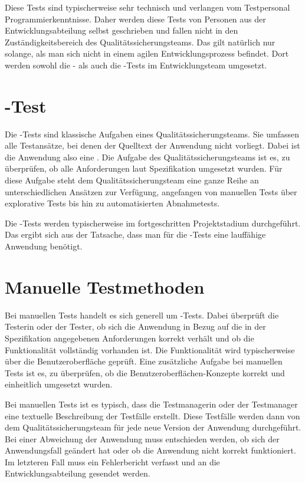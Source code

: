 \SuperPar
Diese Tests sind typischerweise sehr technisch und verlangen vom Testpersonal Programmierkenntnisse. Daher werden diese Tests von Personen aus der Entwicklungsabteilung selbst geschrieben und fallen nicht in den Zuständigkeitsbereich des Qualitätssicherungsteams. Das gilt natürlich nur solange, als man sich nicht in einem agilen Entwicklungsprozess befindet. Dort werden sowohl die - als auch die -Tests im Entwicklungsteam umgesetzt.


\section{-Test}

Die -Tests sind klassische Aufgaben eines Qualitätssicherungsteams. Sie umfassen alle Testansätze, bei denen der Quelltext der Anwendung nicht vorliegt. Dabei ist die Anwendung also eine . Die Aufgabe des Qualitätssicherungsteams ist es, zu überprüfen, ob alle Anforderungen laut Spezifikation umgesetzt wurden. Für diese Aufgabe steht dem Qualitätssicherungsteam eine ganze Reihe an unterschiedlichen Ansätzen zur Verfügung, angefangen von manuellen Tests über explorative Tests bis hin zu automatisierten Abnahmetests. 

\SuperPar
Die -Tests werden typischerweise im fortgeschritten Projektstadium durchgeführt. Das ergibt sich aus der Tatsache, dass man für die -Tests eine lauffähige Anwendung benötigt.

\section{Manuelle Testmethoden}

Bei manuellen Tests handelt es sich generell um -Tests. Dabei überprüft die Testerin oder der Tester, ob sich die Anwendung in Bezug auf die in der Spezifikation angegebenen Anforderungen korrekt verhält und ob die Funktionalität vollständig vorhanden ist. Die Funktionalität wird typischerweise über die Benutzeroberfläche geprüft. Eine zusätzliche Aufgabe bei manuellen Tests ist es, zu überprüfen, ob die Benutzeroberflächen-Konzepte korrekt und einheitlich umgesetzt wurden.

\SuperPar
Bei manuellen Tests ist es typisch, dass die Testmanagerin oder der Testmanager eine textuelle Beschreibung der Testfälle erstellt. Diese Testfälle werden dann von dem Qualitätssicherungsteam für jede neue Version der Anwendung durchgeführt. Bei einer Abweichung der Anwendung muss entschieden werden, ob sich der Anwendungsfall geändert hat oder ob die Anwendung nicht korrekt funktioniert. Im letzteren Fall muss ein Fehlerbericht verfasst und an die Entwicklungsabteilung gesendet werden.

